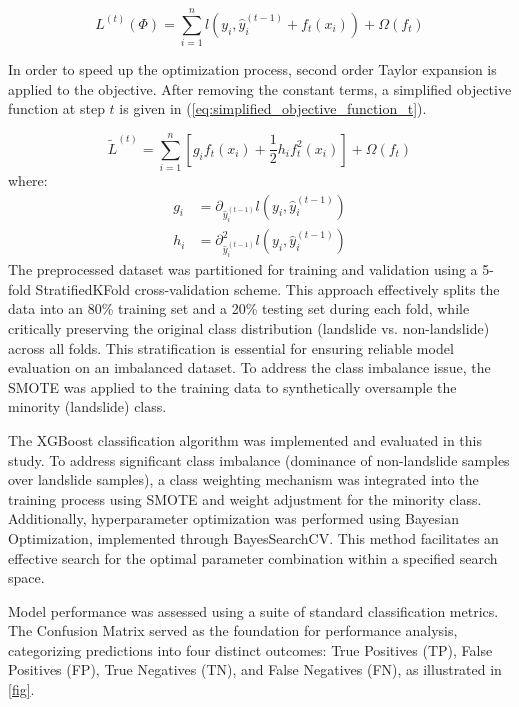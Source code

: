 \begin{equation} \label{eq:objective_function_t}
L^{(t)}(\Phi) = \sum_{i=1}^n l(y_i, \hat{y}_i^{(t-1)} + f_t(x_i)) + \Omega(f_t)
\end{equation}

In order to speed up the optimization process, second order Taylor expansion is applied to the objective. After removing the constant terms, a simplified objective function at step $t$ is given in (\ref{eq:simplified_objective_function_t}).

\begin{equation} \label{eq:simplified_objective_function_t}
\tilde{L}^{(t)} = \sum_{i=1}^n \left[ g_i f_t(x_i) + \frac{1}{2} h_i f_t^2(x_i) \right] + \Omega(f_t)
\end{equation}
where:
\begin{align} \label{eq:g_h_definitions}
g_i &= \partial_{\hat{y}_i^{(t-1)}} l(y_i, \hat{y}_i^{(t-1)}) \\
h_i &= \partial_{\hat{y}_i^{(t-1)}}^2 l(y_i, \hat{y}_i^{(t-1)})
\end{align}
The preprocessed dataset was partitioned for training and validation using a 5-fold StratifiedKFold cross-validation scheme\cite{mthd06}. This approach effectively splits the data into an 80\% training set and a 20\% testing set during each fold, while critically preserving the original class distribution (landslide vs. non-landslide) across all folds. This stratification is essential for ensuring reliable model evaluation on an imbalanced dataset. To address the class imbalance issue, the SMOTE was applied to the training data to synthetically oversample the minority (landslide) class\cite{mthd07}.

The XGBoost classification algorithm was implemented and evaluated in this study. To address significant class imbalance (dominance of non-landslide samples over landslide samples), a class weighting mechanism was integrated into the training process using SMOTE and weight adjustment for the minority class. Additionally, hyperparameter optimization was performed using Bayesian Optimization, implemented through BayesSearchCV\cite{mthd08}. This method facilitates an effective search for the optimal parameter combination within a specified search space.

Model performance was assessed using a suite of standard classification metrics. The Confusion Matrix served as the foundation for performance analysis\cite{mthd09}, categorizing predictions into four distinct outcomes: True Positives (TP), False Positives (FP), True Negatives (TN), and False Negatives (FN), as illustrated in \ref{fig}.

